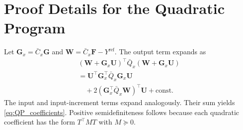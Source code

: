 ﻿\documentclass[journal]{IEEEtran}
\newcommand{\mF}{\mathbf{F}}
\newcommand{\mG}{\mathbf{G}}
\newcommand{\mU}{\mathbf{U}}
\newcommand{\mW}{\mathbf{W}}
\begin{document}
\section{Proof Details for the Quadratic Program}
\label{app:qp}

Let $\mG_x=\bar C_x\mG$ and $\mW=\bar C_x\mF-Y^{\mathrm{ref}}$. The output term expands as
\begin{equation}
    \begin{gathered}
    (\mW+\mG_x\mU)^\top\bar Q_x(\mW+\mG_x\mU)
    \\
    =\mU^\top\mG_x^\top\bar Q_x\mG_x\mU
    \\
    \quad+2(\mG_x^\top\bar Q_x\mW)^\top\mU+\mathrm{const}.
    \end{gathered}
\end{equation}
The input and input-increment terms expand analogously. Their sum yields \eqref{eq:QP_coefficients}. Positive semidefiniteness follows because each quadratic coefficient has the form $T^\top MT$ with $M\succeq0$.
\end{document}
